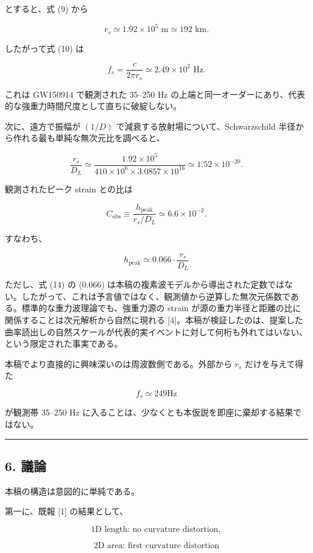 \documentclass[
  a4paper,
]{ltjsarticle}
\begin{document}
とすると、式 (9) から

\[r_s \simeq 1.92\times10^5 \text{ m} \simeq 192 \text{ km}. \tag{11}\]

したがって式 (10) は

\[f_s = \frac{c}{2\pi r_s} \simeq 2.49\times10^2 \text{ Hz}. \tag{12}\]

これは GW150914 で観測された 35--250 Hz
の上端と同一オーダーにあり、代表的な強重力時間尺度として直ちに破綻しない。

次に、遠方で振幅が \((1/D)\) で減衰する放射場について、Schwarzschild
半径から作れる最も単純な無次元比を調べると、

\[\frac{r_s}{D_L} \simeq \frac{1.92\times10^5}{410\times10^6\times3.0857\times10^{16}} \simeq 1.52\times10^{-20}. \tag{13}\]

観測されたピーク strain との比は

\[C_\text{obs} \equiv \frac{h_\text{peak}}{r_s/D_L} \simeq 6.6\times10^{-2}. \tag{14}\]

すなわち、

\[h_\text{peak} \simeq 0.066 \cdot \frac{r_s}{D_L}\]

ただし、式 (14) の (0.066)
は本稿の複素波モデルから導出された定数ではない。したがって、これは予言値ではなく、観測値から逆算した無次元係数である。標準的な重力波理論でも、強重力源の
strain が源の重力半径と距離の比に関係することは次元解析から自然に現れる
{[}4{]}。本稿が検証したのは、提案した曲率読出しの自然スケールが代表的実イベントに対して何桁も外れてはいない、という限定された事実である。

本稿でより直接的に興味深いのは周波数側である。外部から \(r_s\)
だけを与えて得た

\[f_s\simeq249 \text{Hz}\]

が観測帯 35--250 Hz
に入ることは、少なくとも本仮説を即座に棄却する結果ではない。

\begin{center}\rule{0.5\linewidth}{0.5pt}\end{center}

\subsection{6. 議論}\label{ux8b70ux8ad6}

本稿の構造は意図的に単純である。

第一に、既報 {[}1{]} の結果として、

\[\text{1D length: no curvature distortion},\]

\[\text{2D area: first curvature distortion}\]
\end{document}
